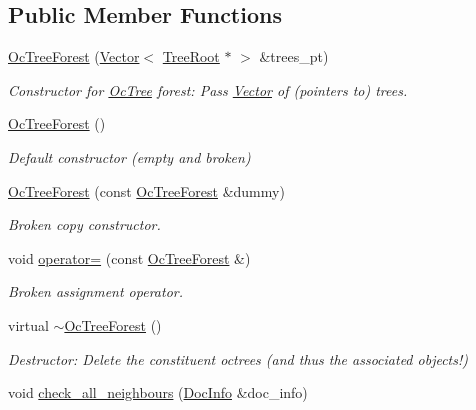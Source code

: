 \subsection*{Public Member Functions}
\begin{DoxyCompactItemize}
\item 
\hyperlink{classoomph_1_1OcTreeForest_a910a35e25b15e40ac748b2f6decb452e}{Oc\+Tree\+Forest} (\hyperlink{classoomph_1_1Vector}{Vector}$<$ \hyperlink{classoomph_1_1TreeRoot}{Tree\+Root} $\ast$ $>$ \&trees\+\_\+pt)
\begin{DoxyCompactList}\small\item\em Constructor for \hyperlink{classoomph_1_1OcTree}{Oc\+Tree} forest\+: Pass \hyperlink{classoomph_1_1Vector}{Vector} of (pointers to) trees. \end{DoxyCompactList}\item 
\hyperlink{classoomph_1_1OcTreeForest_a096f4c113873868084ca2430d0b7f619}{Oc\+Tree\+Forest} ()
\begin{DoxyCompactList}\small\item\em Default constructor (empty and broken) \end{DoxyCompactList}\item 
\hyperlink{classoomph_1_1OcTreeForest_ab28c40f3d62a80f3061bacfdd0485445}{Oc\+Tree\+Forest} (const \hyperlink{classoomph_1_1OcTreeForest}{Oc\+Tree\+Forest} \&dummy)
\begin{DoxyCompactList}\small\item\em Broken copy constructor. \end{DoxyCompactList}\item 
void \hyperlink{classoomph_1_1OcTreeForest_a20994fe3226a0340a051d846e5c30410}{operator=} (const \hyperlink{classoomph_1_1OcTreeForest}{Oc\+Tree\+Forest} \&)
\begin{DoxyCompactList}\small\item\em Broken assignment operator. \end{DoxyCompactList}\item 
virtual \hyperlink{classoomph_1_1OcTreeForest_ab38c7c43f9eb8caa898b49086308bfd8}{$\sim$\+Oc\+Tree\+Forest} ()
\begin{DoxyCompactList}\small\item\em Destructor\+: Delete the constituent octrees (and thus the associated objects!) \end{DoxyCompactList}\item 
void \hyperlink{classoomph_1_1OcTreeForest_a762eaa5790197e03146d42957c03b33e}{check\+\_\+all\+\_\+neighbours} (\hyperlink{classoomph_1_1DocInfo}{Doc\+Info} \&doc\+\_\+info)

\end{DoxyCompactItemize}
